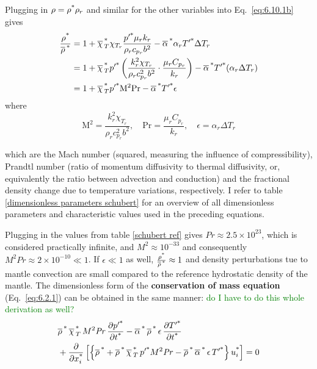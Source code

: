 \documentclass[document.tex]{subfiles}
\begin{document}
\begin{mdframed}
Plugging in $\rho = \rho^{\textup{*}} \rho_r$ and similar for the other variables into Eq.~\eqref{eq:6.10.1b} gives 
\begin{align}
  \begin{split} \label{eq:6.10.7}
    \frac{\rho^{\textup{*}}}{\overline{\rho}\,^{\textup{*}}} &= 1 + \overline{\chi}\,^{\textup{*}}_T \chi_{T_r} \frac{p'^{\textup{*}}\mu_r k_r}{\rho_r c_{p_r}b^2} 
    - \overline{\alpha}\,^{\textup{*}} \alpha_r T'^{\textup{*}}\Delta T_r \\
    &= 1 + \overline{\chi}\,^{\textup{*}}_T p'^{\textup{*}} \left(\dfrac{k_r^2 \chi_{T_r}}{\rho_r c_{p_r}^2 b^2} \cdot \dfrac{\mu_rC_{p_r}}{k_r}\right) - \overline{\alpha}\,^{\textup{*}} T'^{\textup{*}} (\alpha_r\Delta T_r) \\
    &= 1 + \overline{\chi}\,^{\textup{*}}_T p'^{\textup{*}} \mathrm{M}^2\mathrm{Pr} - \overline{\alpha}\,^{\textup{*}} T'^{\textup{*}} \epsilon
  \end{split}
\end{align}
where 
\begin{equation}
  \mathrm{M}^2 = \dfrac{k_r^2 \chi_{T_r}}{\rho_r c_{p_r}^2 b^2}, \quad \mathrm{Pr} =  \dfrac{\mu_rC_{p_r}}{k_r}, \quad \epsilon = \alpha_r\Delta T_r
\end{equation}
 
which are the Mach number (squared, measuring the influence of compressibility), Prandtl number (ratio of momentum diffusivity to thermal diffusivity, or,
equivalently the ratio between advection and conduction) and the fractional density change due to temperature variations, respectively. 
I refer to table \ref{dimensionless parameters schubert} for an overview of all dimensionless parameters and characteristic values used in the preceding equations.
\end{mdframed}


Plugging in the values from table \ref{schubert ref} gives $Pr \approx 2.5 \times 10^{23}$, which is considered practically infinite, and 
$M^2 \approx 10^{-33}$ and consequently $M^2Pr \approx 2 \times 10^{-10} \ll 1$. If $\epsilon \ll 1$ as well, $\frac{\rho^{\textup{*}}}{\overline{\rho}\,^{\textup{*}}} \approx 1$ and 
density perturbations tue to mantle convection are small compared to the reference hydrostatic density of the mantle. 
\newline
The dimensionless form of the \textbf{conservation of mass equation} (Eq.~\eqref{eq:6.2.1}) can be obtained in the same manner: 
\textcolor{green}{do I have to do this whole derivation as well?}
\begin{align}
    \label{eq:6.10.9}
  & \overline{\rho}\,^{\textup{*}}\,\overline{\chi}\,_{T}^{\textup{*}}\, M^2 \mathit{Pr}\,
    \pdv{\ensuremath p'^{\textup{*}}}{\ensuremath t^{\textup{*}}}
    - \overline{\alpha}\,^{\textup{*}}\,\overline{\rho}\,^{\textup{*}}\,\epsilon\,
    \pdv{\ensuremath T'^{\textup{*}}}{\ensuremath t^{\textup{*}}} \nonumber \\
  & + \pdv{\ensuremath x^{\textup{*}}_i}
    \left[ \left\{ \overline{\rho}\,^{\textup{*}}
    + \overline{\rho}\,^{\textup{*}}\,\overline{\chi}\,_{T}^{\textup{*}}\, p'^{\textup{*}} M^2 \mathit{Pr}
    - \overline{\rho}\,^{\textup{*}}\,\overline{\alpha}\,^{\textup{*}}\,\epsilon\, T'^{\textup{*}}
    \right\} u_i^{\textup{*}} \right]
    = 0
\end{align}
\end{document}
